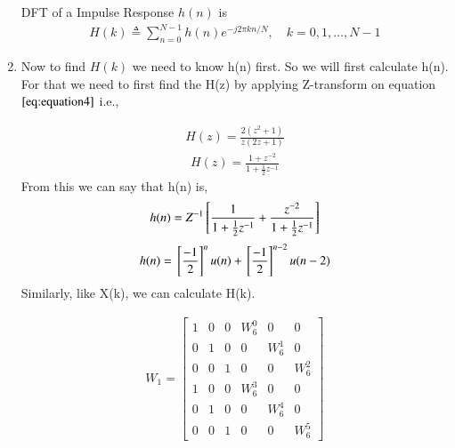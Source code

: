 \documentclass[journal,12pt,twocolumn]{IEEEtran}
\renewcommand\thesection{\arabic{section}}
\begin{document}
\begin{enumerate}[label=\thesection.\arabic*.,ref=\thesection.\theenumi]
DFT of a Impulse Response $h(n)$ is 
\begin{align}
H(k) \triangleq \sum_{n=0}^{N-1} h(n) e^{-j 2 \pi k n / N}, \quad k=0,1, \ldots, N-1
\end{align}
\item
Now to find $H(k)$ we need to know h(n) first. So we will first calculate h(n). For that we need to first find the H(z) by applying Z-transform on equation $\eqref{eq:equation4}$ i.e.,

\begin{align}
H(z) = \frac{2(z^2+1)}{z(2z+1)}
\end{align}
\begin{align}
H(z) = \frac{1+z^{-2}}{1+\frac{1}{2}z^{-1}}
\end{align}
From this we can say that h(n) is,
\begin{align}
h(n)= Z^{-1}{}\left[\frac{1}{1+\frac{1}{2}z^{-1}} + \frac{z^{-2}}{1+\frac{1}{2}z^{-1}}\right]
\end{align}
\begin{align}
h(n)={}\left[\frac{-1}{2}\right]^nu(n) + {}\left[\frac{-1}{2}\right]^{n-2}u(n-2)
\end{align}
Similarly, like X(k), we can calculate H(k).

\begin{align}
W_{1} = 
\begin{bmatrix}
	1 & 0 & 0 & W^{0}_{6} & 0 & 0\\
	0 & 1 & 0 &  0 & W^{1}_{6} & 0\\
	0 & 0 & 1 & 0 & 0 & W^{2}_{6}\\
	1 & 0 & 0 & W^{3}_{6} & 0 & 0\\
	0 & 1 & 0 & 0 & W^{4}_{6} & 0\\
	0 & 0 & 1 & 0 & 0 & W^{5}_{6}
\end{bmatrix}
\end{align}




\end{enumerate}
\end{document}
